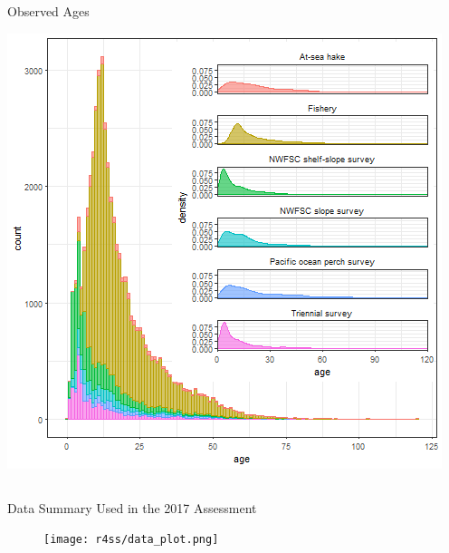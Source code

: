 \documentclass[pdf]{beamer}\usepackage[]{graphicx}\usepackage[]{color}
\begin{document}
\begin{frame}{Observed Ages}
  \begin{center}
  \includegraphics[scale = 0.45]{figures/pop2017_agesbysource.png}
  \end{center}
\end{frame}


\subsection{}
\begin{frame}{Data Summary Used in the 2017 Assessment}
  \begin{figure}[ht]
    \begin{center}
      \texttt{[image: r4ss/data\_plot.png]}

    \end{center}
  \end{figure}
\end{frame}


\end{document}
